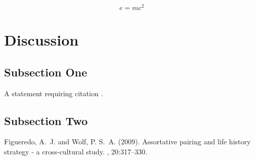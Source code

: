 \documentclass[twoside,twocolumn]{article}
\begin{document}
\blindtext %

\begin{equation}
\label{eq:emc}
e = mc^2
\end{equation}

\blindtext %


\section{Discussion}

\subsection{Subsection One}

A statement requiring citation \cite{Figueredo:2009dg}.
\blindtext %

\subsection{Subsection Two}

\blindtext %


\begin{thebibliography}{99} %

Figueredo, A.~J. and Wolf, P. S.~A. (2009).
\newblock Assortative pairing and life history strategy - a cross-cultural
  study.
, 20:317--330.
 
\end{thebibliography}

\end{document}
